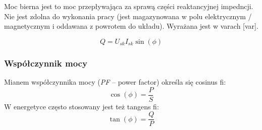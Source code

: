 Moc bierna jest to moc przepływająca za sprawą części reaktancyjnej impedncji.
Nie jest zdolna do wykonania pracy (jest magazynowana w polu elektrycznym / magnetycznym i oddawana z powrotem do układu).
Wyrażana jest w varach [var].

	$$Q = U_{sk} I_{sk} \sin(\phi)$$

\subsubsection{Współczynnik mocy}

Mianem współczynnika mocy (\textit{PF} – power factor) określa się cosinus fi:
	$$\cos(\phi) = \frac{P}{S}$$
W energetyce często stosowany jest też tangens fi:
	$$\tan(\phi) = \frac{Q}{P}$$

